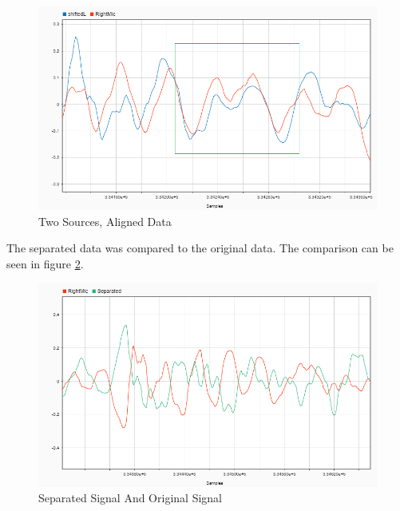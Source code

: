 \begin{figure}[htp]
  \centering
  \includegraphics[width=1\linewidth]{Illustrations/twoSourcesShiftedandOriginal.png}
  \caption{Two Sources, Aligned Data}
  \label{fig:2sourcesShifted}
\end{figure}
\newpage
The separated data was compared to the original data. The comparison can be seen in figure \ref{fig:2sourcesSeparated}.
\begin{figure}[htp]
  \centering
  \includegraphics[width=0.7\linewidth]{Illustrations/twoSourcesSeparatedandOriginal.png}
  \caption{Separated Signal And Original Signal}
  \label{fig:2sourcesSeparated}
\end{figure}
